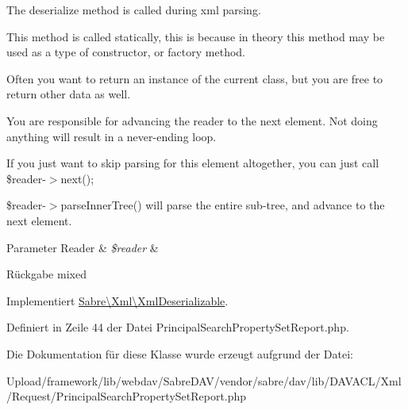 The deserialize method is called during xml parsing.

This method is called statically, this is because in theory this method may be used as a type of constructor, or factory method.

Often you want to return an instance of the current class, but you are free to return other data as well.

You are responsible for advancing the reader to the next element. Not doing anything will result in a never-\/ending loop.

If you just want to skip parsing for this element altogether, you can just call \$reader-\/$>$next();

\$reader-\/$>$parse\+Inner\+Tree() will parse the entire sub-\/tree, and advance to the next element.


\begin{DoxyParams}[1]{Parameter}
Reader & {\em \$reader} & \\
\hline
\end{DoxyParams}
\begin{DoxyReturn}{Rückgabe}
mixed 
\end{DoxyReturn}


Implementiert \mbox{\hyperlink{interface_sabre_1_1_xml_1_1_xml_deserializable_a19e0eca545b9a0d93f7d6b69085ade30}{Sabre\textbackslash{}\+Xml\textbackslash{}\+Xml\+Deserializable}}.



Definiert in Zeile 44 der Datei Principal\+Search\+Property\+Set\+Report.\+php.



Die Dokumentation für diese Klasse wurde erzeugt aufgrund der Datei\+:\begin{DoxyCompactItemize}
\item 
Upload/framework/lib/webdav/\+Sabre\+D\+A\+V/vendor/sabre/dav/lib/\+D\+A\+V\+A\+C\+L/\+Xml/\+Request/Principal\+Search\+Property\+Set\+Report.\+php\end{DoxyCompactItemize}
